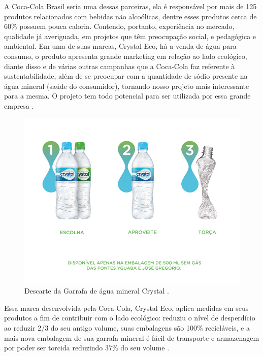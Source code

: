       A Coca-Cola Brasil seria uma dessas parceiras, ela é responsável por mais de 125 produtos relacionados com bebidas não 
      alcoólicas, dentre esses produtos cerca de 60\% possuem pouca caloria. Contendo, portanto, experiência no mercado, qualidade 
      já averiguada, em projetos que têm preocupação social, e pedagógica e ambiental. Em uma de suas marcas, Crystal Eco, há
      a venda de água para consumo, o produto apresenta grande marketing em relação ao lado ecológico, diante disso e de várias
      outras campanhas que a Coca-Cola faz referente à sustentabilidade, além de se preocupar com a quantidade de sódio presente
      na água mineral (saúde do consumidor), tornando nosso projeto mais interessante para a mesma. O projeto tem todo potencial 
      para ser utilizada por essa grande empresa \footnotemark.
      
      
      \begin{figure}[!htbp]
	\centering
	\includegraphics[scale=0.35]{editaveis/figuras/descarte_garrafa_agua}
	\caption[Descarte da Garrafa de água mineral Crystal]
	{Descarte da Garrafa de água mineral Crystal \footnotemark.}
	\label{descarte_garrafa_agua}
      \end{figure}
      
      Essa marca desenvolvida pela Coca-Cola, Crystal Eco, aplica medidas em seus produtos a fim de contribuir com o lado 
      ecológico: reduziu o nível de desperdício ao reduzir 2/3 do seu antigo volume, suas embalagens são 100\% recicláveis,
      e a mais nova embalagem de sua garrafa mineral é fácil de transporte e armazenagem por poder ser torcida reduzindo 37\%
      do seu volume \footnotemark.
      
